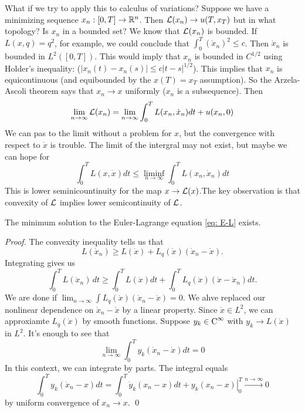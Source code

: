 What if we try to apply this to calculus of variations? Suppose we have a minimizing
sequence $x_n:[0,T] \to \mathbb{R}^n$. Then $\mathcal{L}(x_n) \to u(T, x_T)$ but in what topology? Is $x_n$ in a bounded set? We know that $\mathcal{L}(x_n)$ is bounded. If$L(x,q) = q^2$, for example, we could conclude that $\int_0^T(\dot x_n)^2 \le c$. Then $\dot x_n$ is bounded in $L^2([0,T])$. This would imply that $x_n$ is bounded in $C^{1/2}$ using Holder's inequality: ($|x_n(t)-x_n(s)|\le c|t-s|^{1/2}$).  This implies that $x_n$ is equicontinuous (and equibounded by the $x(T) = x_T$ assumption). So the Arzela-Ascoli theorem says that $x_n \to x$ uniformly ($x_n$ is a subsequence). Then 
\[
    \lim_{n\to \infty} \mathcal{L}(x_n) = \lim_{n\to \infty}\int_0^TL(x_n, \dot x_n) dt + u(x_n,0)
\]
We can pas to the limit without a problem for $x$, but the convergence with respect to $\dot x$ is trouble. The limit of the intergral may not exist, but maybe we can hope for 
\[
    \int_{0}^{T} L(x, \dot{x}) d t \leq \liminf _{n \rightarrow \infty} \int_{0}^{T} L\left(x_{n}, \dot{x}_{n}\right) d t
\]
This is lower seminicountinuity for the map $x\to \mathcal{L}(x)$.The key observation is that convexity of $\mathcal{L}$ implies lower semicontinuity of $\mathcal{L}$.

\begin{proposition}
    The minimum solution to the Euler-Lagrange equation \eqref{eq: E-L} exists.
\end{proposition}
\begin{proof}
    The convexity inequality tells us that 
    \[
        L(\dot x_n) \ge L(\dot x) + L_q(\dot x) (\dot x_n-\dot x).
    \]
    Integrating gives us 
    \[
        \int_0^T L(\dot x_n) \, dt \ge \int_0^T L(\dot x) dt + \int_0^T L_q(\dot x)(\dot x - \dot x_n) dt.
    \]
    We are done if $\lim_{n\to \infty}\int L_q(\dot x) (\dot x_n - \dot x) =0$. We ahve replaced our nonlinear dependence on $\dot x_n - \dot x$ by a linear property. Since $\dot x \in L^2$, we can approxiamte $L_q(\dot x)$ by smooth functions. Suppose $y_k\in \operatorname{C}^\infty$ with $y_k\to L(\dot x)$ in $L^2$. It's enough to see that 
    \[
        \lim _{n \rightarrow \infty} \int_{0}^{T} y_{k}\left(\dot{x}_{n}-\dot{x}\right) d t=0
    \]
    In this context, we can integrate by parts. The integral equals 
    \[
        \int_{0}^{T} y_{k}\left(\dot{x}_{n}-x\right) d t=\int_{0}^{T} \dot{y}_{k}\left(x_{n}-x\right) d t+\left.y_{k}\left(x_{n}-x\right)\right|_{0} ^{T} \stackrel{n \rightarrow \infty}{\longrightarrow} 0
    \]
    by uniform convergence of $x_n \to x$. 
    \qed 
\end{proof}

